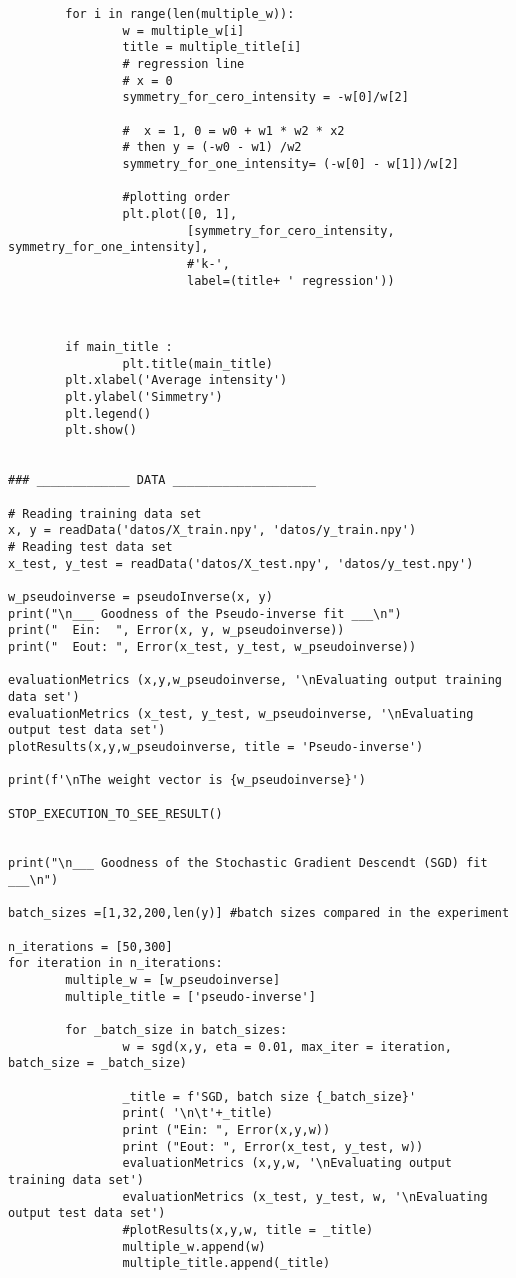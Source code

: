 \begin{verbatim}
        for i in range(len(multiple_w)):
                w = multiple_w[i]
                title = multiple_title[i]
                # regression line
                # x = 0
                symmetry_for_cero_intensity = -w[0]/w[2]

                #  x = 1, 0 = w0 + w1 * w2 * x2
                # then y = (-w0 - w1) /w2
                symmetry_for_one_intensity= (-w[0] - w[1])/w[2]

                #plotting order
                plt.plot([0, 1],
                         [symmetry_for_cero_intensity, symmetry_for_one_intensity],
                         #'k-',
                         label=(title+ ' regression'))

                

        if main_title :
                plt.title(main_title)
        plt.xlabel('Average intensity')
        plt.ylabel('Simmetry')
        plt.legend()
        plt.show()
        

### _____________ DATA ____________________

# Reading training data set 
x, y = readData('datos/X_train.npy', 'datos/y_train.npy')
# Reading test data set 
x_test, y_test = readData('datos/X_test.npy', 'datos/y_test.npy')

w_pseudoinverse = pseudoInverse(x, y) 
print("\n___ Goodness of the Pseudo-inverse fit ___\n")
print("  Ein:  ", Error(x, y, w_pseudoinverse))
print("  Eout: ", Error(x_test, y_test, w_pseudoinverse))

evaluationMetrics (x,y,w_pseudoinverse, '\nEvaluating output training data set')
evaluationMetrics (x_test, y_test, w_pseudoinverse, '\nEvaluating output test data set')
plotResults(x,y,w_pseudoinverse, title = 'Pseudo-inverse') 

print(f'\nThe weight vector is {w_pseudoinverse}')

STOP_EXECUTION_TO_SEE_RESULT()


print("\n___ Goodness of the Stochastic Gradient Descendt (SGD) fit ___\n")

batch_sizes =[1,32,200,len(y)] #batch sizes compared in the experiment

n_iterations = [50,300] 
for iteration in n_iterations:
        multiple_w = [w_pseudoinverse]
        multiple_title = ['pseudo-inverse']

        for _batch_size in batch_sizes:
                w = sgd(x,y, eta = 0.01, max_iter = iteration, batch_size = _batch_size)

                _title = f'SGD, batch size {_batch_size}'
                print( '\n\t'+_title)
                print ("Ein: ", Error(x,y,w))
                print ("Eout: ", Error(x_test, y_test, w))
                evaluationMetrics (x,y,w, '\nEvaluating output training data set')
                evaluationMetrics (x_test, y_test, w, '\nEvaluating output test data set')
                #plotResults(x,y,w, title = _title)
                multiple_w.append(w)
                multiple_title.append(_title)
        

\end{verbatim}
